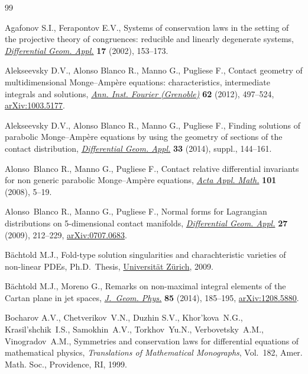 \begin{thebibliography}{99}
\footnotesize\itemsep=-0.8pt

Agafonov S.I., Ferapontov E.V., Systems of conservation laws in the setting of
 the projective theory of congruences: reducible and linearly degenerate
 systems, \href{http://dx.doi.org/10.1016/S0926-2245(02)00105-5}{\textit{Differential Geom. Appl.}} \textbf{17} (2002), 153--173.

Alekseevsky D.V., Alonso Blanco R., Manno G., Pugliese F., Contact geometry of
 multidimensional {M}onge--{A}mp\`ere equations: characteristics, intermediate
 integrals and solutions, \href{http://dx.doi.org/10.5802/aif.2686}{\textit{Ann. Inst. Fourier (Grenoble)}} \textbf{62}
 (2012), 497--524, \href{http://arxiv.org/abs/1003.5177}{arXiv:1003.5177}.

Alekseevsky D.V., Alonso Blanco R., Manno G., Pugliese F., Finding solutions of
 parabolic {M}onge--{A}mp\`ere equations by using the geometry of sections of
 the contact distribution, \href{http://dx.doi.org/10.1016/j.difgeo.2013.10.015}{\textit{Differential Geom. Appl.}} \textbf{33}
 (2014), suppl., 144--161.

Alonso~Blanco R., Manno G., Pugliese F., Contact relative dif\/ferential
 invariants for non generic parabolic {M}onge--{A}mp\`ere equations,
 \href{http://dx.doi.org/10.1007/s10440-008-9204-8}{\textit{Acta Appl. Math.}} \textbf{101} (2008), 5--19.

Alonso~Blanco R., Manno G., Pugliese F., Normal forms for {L}agrangian
 distributions on 5-dimensional contact manifolds, \href{http://dx.doi.org/10.1016/j.difgeo.2008.06.019}{\textit{Differential Geom.
 Appl.}} \textbf{27} (2009), 212--229, \href{http://arxiv.org/abs/0707.0683}{arXiv:0707.0683}.

B{\"a}chtold M.J., Fold-type solution singularities and charachteristic
 varieties of non-linear PDEs, Ph.D.~Thesis, \href{http://dx.doi.org/10.5167/uzh-42719}{Universit\"at Z\"urich}, 2009.

B{\"a}chtold M.J., Moreno G., Remarks on non-maximal integral elements of the
 {C}artan plane in jet spaces, \href{http://dx.doi.org/10.1016/j.geomphys.2014.05.006}{\textit{J.~Geom. Phys.}} \textbf{85} (2014),
 185--195, \href{http://arxiv.org/abs/1208.5880}{arXiv:1208.5880}.

Bocharov A.V., Chetverikov~V.N., Duzhin S.V., Khor'kova~N.G., Krasil'shchik~I.S., Samokhin~A.V., Torkhov~Yu.N., Verbovetsky~A.M., Vinogradov~A.M.,
 Symmetries and conservation laws for dif\/ferential equations of mathematical
 physics, \textit{Translations of Mathematical Monographs}, Vol.~182, Amer.
 Math. Soc., Providence, RI, 1999.


\end{thebibliography}
